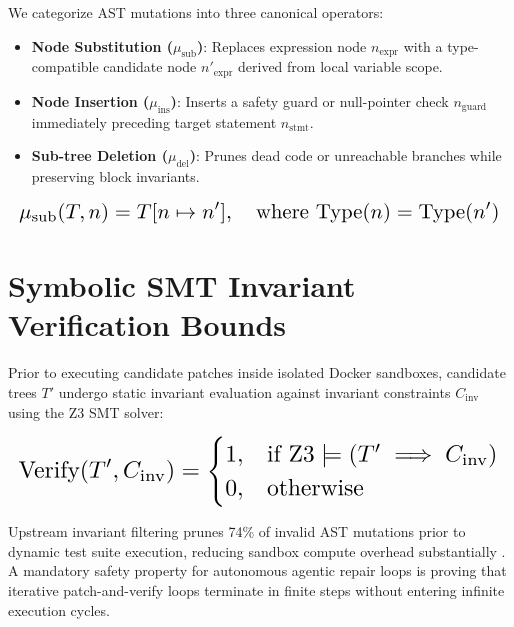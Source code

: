 \documentclass[10pt,twocolumn,letterpaper]{article}
\begin{document}
We categorize AST mutations into three canonical operators:
\begin{itemize}
  \item \textbf{Node Substitution ($\mu_{\text{sub}}$)}: Replaces expression node $n_{\text{expr}}$ with a type-compatible candidate node $n'_{\text{expr}}$ derived from local variable scope.
  \item \textbf{Node Insertion ($\mu_{\text{ins}}$)}: Inserts a safety guard or null-pointer check $n_{\text{guard}}$ immediately preceding target statement $n_{\text{stmt}}$.
  \item \textbf{Sub-tree Deletion ($\mu_{\text{del}}$)}: Prunes dead code or unreachable branches while preserving block invariants.
\end{itemize}


\begin{equation}
\resizebox{\columnwidth}{!}{$\displaystyle
\begin{aligned}
\mu_{\text{sub}}(T, n) = T[n \mapsto n'], \quad \text{where } \text{Type}(n) = \text{Type}(n')
\end{aligned}
$}
\end{equation}




\section{Symbolic SMT Invariant Verification Bounds}


Prior to executing candidate patches inside isolated Docker sandboxes, candidate trees $T'$ undergo static invariant evaluation against invariant constraints $C_{\text{inv}}$ using the Z3 SMT solver:


\begin{equation}
\resizebox{\columnwidth}{!}{$\displaystyle
\begin{aligned}
\text{Verify}(T', C_{\text{inv}}) = \begin{cases} 1, & \text{if } \text{Z3} \models (T' \implies C_{\text{inv}}) \\ 0, & \text{otherwise} \end{cases}
\end{aligned}
$}
\end{equation}


Upstream invariant filtering prunes 74\% of invalid AST mutations prior to dynamic test suite execution, reducing sandbox compute overhead substantially \cite{wooldridge2009}. A mandatory safety property for autonomous agentic repair loops is proving that iterative patch-and-verify loops terminate in finite steps without entering infinite execution cycles.


\par\vspace{0.5em}
\balance


\end{document}
